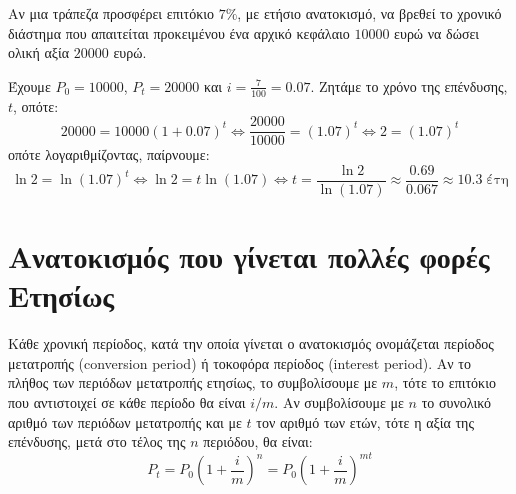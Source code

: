 \begin{example}
  Αν μια τράπεζα προσφέρει επιτόκιο $ 7\% $, με ετήσιο ανατοκισμό, να βρεθεί το χρονικό 
  διάστημα που απαιτείται προκειμένου ένα αρχικό κεφάλαιο $ 10000 $ ευρώ να δώσει ολική 
  αξία $ 20000 $ ευρώ.
\end{example}
\begin{solution}
  Έχουμε $ P_{0} = 10000$, $ P_{t}=20000 $ και $ i= \frac{7}{100} = 0.07 $. Ζητάμε 
  το χρόνο της επένδυσης, $t$, οπότε:
  \[
    20000 = 10000 (1+0.07)^{t} \Leftrightarrow \frac{20000}{10000} = (1.07)^{t}
    \Leftrightarrow 2 = (1.07)^{t} 
  \]
  οπότε λογαριθμίζοντας, παίρνουμε:
  \[ \ln{2} = \ln{(1.07)}^{t} \Leftrightarrow \ln{2} = t \ln{(1.07)} \Leftrightarrow t =
  \frac{\ln{2}}{\ln{(1.07)}} \approx \frac{0.69}{0.067} \approx 10.3 \; \text{έτη} \]
\end{solution}


\section*{Ανατοκισμός που γίνεται πολλές φορές Ετησίως}

Κάθε χρονική περίοδος, κατά την οποία γίνεται ο ανατοκισμός ονομάζεται
\textcolor{Col1}{περίοδος μετατροπής} (conversion period) ή τοκοφόρα περίοδος 
(interest period). Αν το πλήθος των περιόδων μετατροπής ετησίως, το συμβολίσουμε με 
$ m $, τότε το επιτόκιο που αντιστοιχεί σε κάθε περίοδο θα είναι $ {i}/{m} $. Αν 
συμβολίσουμε με $n$ το συνολικό αριθμό των περιόδων μετατροπής και με $t$ τον αριθμό 
των ετών, τότε η αξία της επένδυσης, μετά στο τέλος της $n$ περιόδου, θα είναι:
\[
  P_{t} = P_{0} \left(1+ \frac{i}{m} \right)^{n} = 
  P_{0}\left(1+ \frac{i}{m} \right)^{mt} 
\] 

